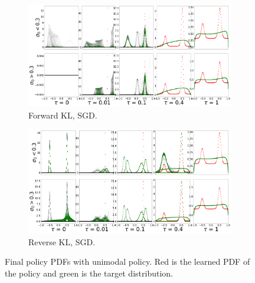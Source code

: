 \documentclass{article}
\begin{document}
\begin{figure}[!ht]
  \begin{subfigure}[b]{0.4\linewidth}
    \centering
    \includegraphics[width=1\columnwidth]{figs/bandit/notlearnQ/modes=1/sgd/pdf_forward_optim=sgd_modes=1_lr=0.01.png}
    \caption{Forward KL, SGD.}
    \label{fig:bandit-pdf-forward-sgd}
  \end{subfigure}%
  \begin{subfigure}[b]{0.4\linewidth}
    \centering
    \includegraphics[width=1\columnwidth]{figs/bandit/notlearnQ/modes=1/sgd/pdf_reverse_optim=sgd_modes=1_lr=0.01.png}
    \caption{Reverse KL, SGD.}
    \label{fig:bandit-pdf-reverse-sgd}
  \end{subfigure}
  \caption{Final policy PDFs with unimodal policy. Red is the learned PDF of the policy and green is the target distribution. }
\end{figure}

\clearpage


  
\end{document}
